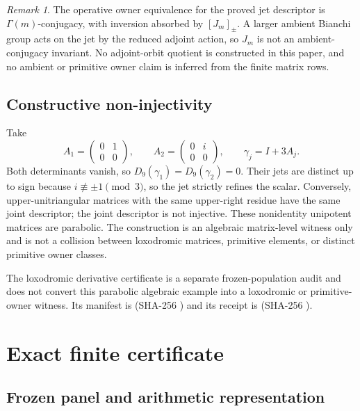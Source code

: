 \documentclass[11pt,a4paper]{article}
\theoremstyle{definition}
\theoremstyle{remark}
\newtheorem{remark}[theorem]{Remark}
\begin{document}
\begin{remark}
The operative owner equivalence for the proved jet descriptor is \(\Gamma(m)\)-conjugacy, with inversion absorbed by \([J_m]_{\pm}\). A larger ambient Bianchi group acts on the jet by the reduced adjoint action, so \(J_m\) is not an ambient-conjugacy invariant. No adjoint-orbit quotient is constructed in this paper, and no ambient or primitive owner claim is inferred from the finite matrix rows.
\end{remark}

\subsection{Constructive non-injectivity}

Take
\[
 A_1=\begin{pmatrix}0&1\\0&0\end{pmatrix},\qquad
 A_2=\begin{pmatrix}0&i\\0&0\end{pmatrix},\qquad
 \gamma_j=I+3A_j.
\]
Both determinants vanish, so \(D_9(\gamma_1)=D_9(\gamma_2)=0\). Their jets are distinct up to sign because \(i\not\equiv\pm1\pmod3\), so the jet strictly refines the scalar. Conversely, upper-unitriangular matrices with the same upper-right residue have the same joint descriptor; the joint descriptor is not injective. These nonidentity unipotent matrices are parabolic. The construction is an algebraic matrix-level witness only and is not a collision between loxodromic matrices, primitive elements, or distinct primitive owner classes.

The loxodromic derivative certificate is a separate frozen-population audit and does not convert this parabolic algebraic example into a loxodromic or primitive-owner witness. Its manifest is  (SHA-256 ) and its receipt is  (SHA-256 ).

\section{Exact finite certificate}

\subsection{Frozen panel and arithmetic representation}
\end{document}
